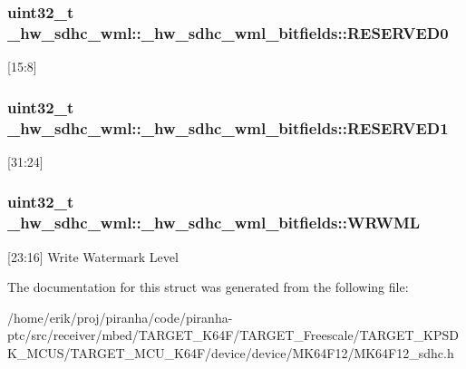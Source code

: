 \subsubsection[{\texorpdfstring{R\+E\+S\+E\+R\+V\+E\+D0}{RESERVED0}}]{\setlength{\rightskip}{0pt plus 5cm}uint32\+\_\+t \+\_\+hw\+\_\+sdhc\+\_\+wml\+::\+\_\+hw\+\_\+sdhc\+\_\+wml\+\_\+bitfields\+::\+R\+E\+S\+E\+R\+V\+E\+D0}\hypertarget{struct__hw__sdhc__wml_1_1__hw__sdhc__wml__bitfields_ad8e51cdb32a47d601bebd10f7f50555d}{}\label{struct__hw__sdhc__wml_1_1__hw__sdhc__wml__bitfields_ad8e51cdb32a47d601bebd10f7f50555d}
\mbox{[}15\+:8\mbox{]} 
\subsubsection[{\texorpdfstring{R\+E\+S\+E\+R\+V\+E\+D1}{RESERVED1}}]{\setlength{\rightskip}{0pt plus 5cm}uint32\+\_\+t \+\_\+hw\+\_\+sdhc\+\_\+wml\+::\+\_\+hw\+\_\+sdhc\+\_\+wml\+\_\+bitfields\+::\+R\+E\+S\+E\+R\+V\+E\+D1}\hypertarget{struct__hw__sdhc__wml_1_1__hw__sdhc__wml__bitfields_aa65460110393b2fe8716da9f51b423c9}{}\label{struct__hw__sdhc__wml_1_1__hw__sdhc__wml__bitfields_aa65460110393b2fe8716da9f51b423c9}
\mbox{[}31\+:24\mbox{]} 
\subsubsection[{\texorpdfstring{W\+R\+W\+ML}{WRWML}}]{\setlength{\rightskip}{0pt plus 5cm}uint32\+\_\+t \+\_\+hw\+\_\+sdhc\+\_\+wml\+::\+\_\+hw\+\_\+sdhc\+\_\+wml\+\_\+bitfields\+::\+W\+R\+W\+ML}\hypertarget{struct__hw__sdhc__wml_1_1__hw__sdhc__wml__bitfields_a2c72b7f7e679622adfcec57e7dc7603d}{}\label{struct__hw__sdhc__wml_1_1__hw__sdhc__wml__bitfields_a2c72b7f7e679622adfcec57e7dc7603d}
\mbox{[}23\+:16\mbox{]} Write Watermark Level 

The documentation for this struct was generated from the following file\+:\begin{DoxyCompactItemize}
\item 
/home/erik/proj/piranha/code/piranha-\/ptc/src/receiver/mbed/\+T\+A\+R\+G\+E\+T\+\_\+\+K64\+F/\+T\+A\+R\+G\+E\+T\+\_\+\+Freescale/\+T\+A\+R\+G\+E\+T\+\_\+\+K\+P\+S\+D\+K\+\_\+\+M\+C\+U\+S/\+T\+A\+R\+G\+E\+T\+\_\+\+M\+C\+U\+\_\+\+K64\+F/device/device/\+M\+K64\+F12/M\+K64\+F12\+\_\+sdhc.\+h\end{DoxyCompactItemize}

